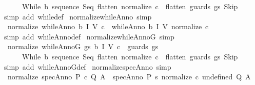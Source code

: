 \begin{isabellebody}
\ \ \ \ \ \ {\isacharparenleft}While\ b\ {\isacharparenleft}sequence\ Seq\ {\isacharparenleft}flatten\ {\isacharparenleft}normalize\ c{\isacharparenright}\ {\isacharat}\ flatten\ {\isacharparenleft}guards\ gs\ Skip{\isacharparenright}{\isacharparenright}{\isacharparenright}{\isacharparenright}{\isachardoublequoteclose}\ \isanewline
%
\isadelimproof
\ \ %
\endisadelimproof
%
\isatagproof
{}\isamarkupfalse%
\ {\isacharparenleft}simp\ add{\isacharcolon}\ while{\isacharunderscore}def{\isacharparenright}%
\endisatagproof
{\isafoldproof}%
%
\isadelimproof
\isanewline
%
\endisadelimproof
\isanewline
{}\isamarkupfalse%
\ normalize{\isacharunderscore}whileAnno\ {\isacharbrackleft}simp{\isacharbrackright}{\isacharcolon}\isanewline
\ \ {\isachardoublequoteopen}normalize\ {\isacharparenleft}whileAnno\ b\ I\ V\ c{\isacharparenright}\ {\isacharequal}\ whileAnno\ b\ I\ V\ {\isacharparenleft}normalize\ c{\isacharparenright}{\isachardoublequoteclose}\isanewline
%
\isadelimproof
\ \ %
\endisadelimproof
%
\isatagproof
{}\isamarkupfalse%
\ {\isacharparenleft}simp\ add{\isacharcolon}\ whileAnno{\isacharunderscore}def{\isacharparenright}%
\endisatagproof
{\isafoldproof}%
%
\isadelimproof
\isanewline
%
\endisadelimproof
\isanewline
{}\isamarkupfalse%
\ normalize{\isacharunderscore}whileAnnoG\ {\isacharbrackleft}simp{\isacharbrackright}{\isacharcolon}\isanewline
\ \ {\isachardoublequoteopen}normalize\ {\isacharparenleft}whileAnnoG\ gs\ b\ I\ V\ c{\isacharparenright}\ {\isacharequal}\ guards\ gs\isanewline
\ \ \ \ \ \ {\isacharparenleft}While\ b\ {\isacharparenleft}sequence\ Seq\ {\isacharparenleft}flatten\ {\isacharparenleft}normalize\ c{\isacharparenright}\ {\isacharat}\ flatten\ {\isacharparenleft}guards\ gs\ Skip{\isacharparenright}{\isacharparenright}{\isacharparenright}{\isacharparenright}{\isachardoublequoteclose}\ \isanewline
%
\isadelimproof
\ \ %
\endisadelimproof
%
\isatagproof
{}\isamarkupfalse%
\ {\isacharparenleft}simp\ add{\isacharcolon}\ whileAnnoG{\isacharunderscore}def{\isacharparenright}%
\endisatagproof
{\isafoldproof}%
%
\isadelimproof
\isanewline
%
\endisadelimproof
\isanewline
{}\isamarkupfalse%
\ normalize{\isacharunderscore}specAnno\ {\isacharbrackleft}simp{\isacharbrackright}{\isacharcolon}\isanewline
\ \ {\isachardoublequoteopen}normalize\ {\isacharparenleft}specAnno\ P\ c\ Q\ A{\isacharparenright}\ {\isacharequal}\ specAnno\ P\ {\isacharparenleft}{\isasymlambda}s{\isachardot}\ normalize\ {\isacharparenleft}c\ undefined{\isacharparenright}{\isacharparenright}\ Q\ A{\isachardoublequoteclose}\isanewline

\end{isabellebody}
